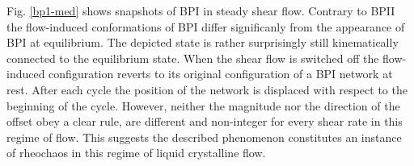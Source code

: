 \documentclass[aps,pre,reprint,superscriptaddress, twocolumn]{revtex4}
\newcommand{\gd}{\dot{\gamma}}
\begin{document}
Fig. \ref{bp1-med} shows snapshots of BPI in steady shear flow. 
Contrary to BPII the flow-induced conformations of BPI differ significanly 
from the appearance of BPI at equilibrium. The depicted 
state is rather surprisingly still kinematically connected to the equilibrium state.
When the shear flow is switched off the flow-induced configuration reverts
to its original configuration of a BPI network at rest.
After each cycle the position of the network is displaced with respect to the beginning of the cycle.
However, neither the magnitude nor the direction of the offset obey a clear rule,
are different and non-integer for every shear rate in this regime of flow. 
This suggests the described phenomenon constitutes an instance of rheochaos in this 
regime of liquid crystalline flow. 
\end{document}

